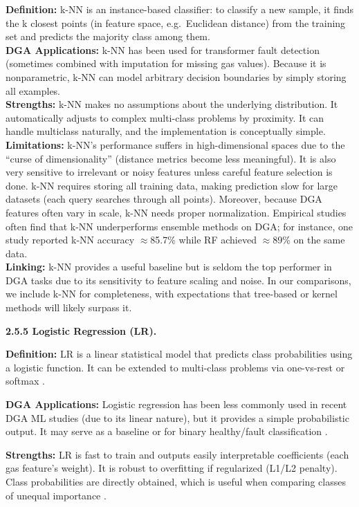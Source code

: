 \textbf{Definition:} k-NN is an instance-based classifier: to classify a
new sample, it finds the k closest points (in feature space,
e.g.~Euclidean distance) from the training set and predicts the majority
class among them.\\
\textbf{DGA Applications:} k-NN has been used for transformer fault
detection (sometimes combined with imputation for missing gas values).
Because it is nonparametric, k-NN can model arbitrary decision
boundaries by simply storing all examples.\\
\textbf{Strengths:} k-NN makes no assumptions about the underlying
distribution. It automatically adjusts to complex multi-class problems
by proximity. It can handle multiclass naturally, and the implementation
is conceptually simple.\\
\textbf{Limitations:} k-NN's performance suffers in high-dimensional
spaces due to the ``curse of dimensionality'' (distance metrics become
less meaningful). It is also very sensitive to irrelevant or noisy
features unless careful feature selection is done. k-NN requires storing
all training data, making prediction slow for large datasets (each query
searches through all points). Moreover, because DGA features often vary
in scale, k-NN needs proper normalization. Empirical studies often find
that k-NN underperforms ensemble methods on DGA; for instance, one study
reported k-NN accuracy \(\approx\)85.7\% while RF achieved \(\approx\)89\% on the same
data.\\
\textbf{Linking:} k-NN provides a useful baseline but is seldom the top
performer in DGA tasks due to its sensitivity to feature scaling and
noise. In our comparisons, we include k-NN for completeness, with
expectations that tree-based or kernel methods will likely surpass it.

\noindent\textbf{2.5.5 Logistic Regression (LR).}\label{logistic-regression-lr}

\textbf{Definition:} LR is a linear statistical model that predicts
class probabilities using a logistic function. It can be extended to
multi-class problems via one-vs-rest or softmax \parencite{Wang2023}.

\textbf{DGA Applications:} Logistic regression has been less commonly
used in recent DGA ML studies (due to its linear nature), but it
provides a simple probabilistic output. It may serve as a baseline or
for binary healthy/fault classification \parencite{Kumar2024}.

\textbf{Strengths:} LR is fast to train and outputs easily interpretable
coefficients (each gas feature's weight). It is robust to overfitting if
regularized (L1/L2 penalty). Class probabilities are directly obtained,
which is useful when comparing classes of unequal importance
\parencite{Laburu2024}.

